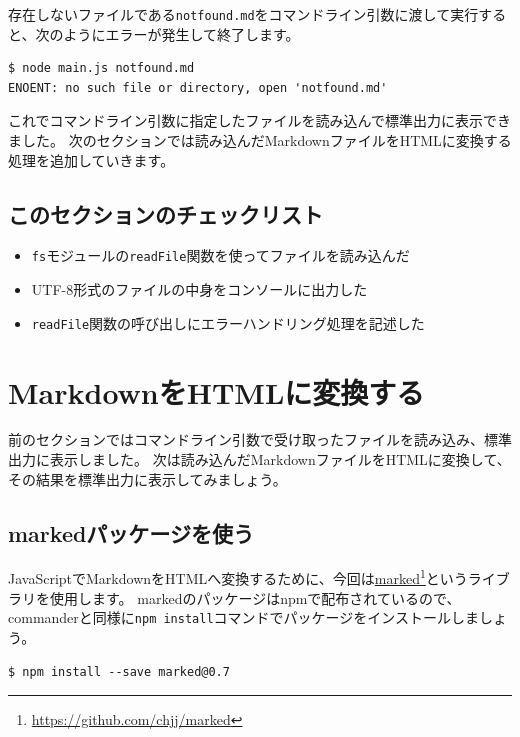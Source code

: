 存在しないファイルである\texttt{notfound.md}をコマンドライン引数に渡して実行すると、次のようにエラーが発生して終了します。

\begin{lstlisting}
$ node main.js notfound.md
ENOENT: no such file or directory, open 'notfound.md'
\end{lstlisting}

これでコマンドライン引数に指定したファイルを読み込んで標準出力に表示できました。
次のセクションでは読み込んだMarkdownファイルをHTMLに変換する処理を追加していきます。

\hypertarget{section-checklist}{%
\subsection{このセクションのチェックリスト}\label{section-checklist}}

\begin{itemize}
\item
  \texttt{fs}モジュールの\texttt{readFile}関数を使ってファイルを読み込んだ
\item
  UTF-8形式のファイルの中身をコンソールに出力した
\item
  \texttt{readFile}関数の呼び出しにエラーハンドリング処理を記述した
\end{itemize}

\hypertarget{md-to-html}{%
\section{MarkdownをHTMLに変換する}\label{md-to-html}}

前のセクションではコマンドライン引数で受け取ったファイルを読み込み、標準出力に表示しました。
次は読み込んだMarkdownファイルをHTMLに変換して、その結果を標準出力に表示してみましょう。

\hypertarget{use-marked-package}{%
\subsection{markedパッケージを使う}\label{use-marked-package}}

JavaScriptでMarkdownをHTMLへ変換するために、今回は\href{https://github.com/chjj/marked}{marked}\footnote{\url{https://github.com/chjj/marked}}というライブラリを使用します。
markedのパッケージはnpmで配布されているので、commanderと同様に\texttt{npm install}コマンドでパッケージをインストールしましょう。

\begin{lstlisting}
$ npm install --save marked@0.7
\end{lstlisting}

